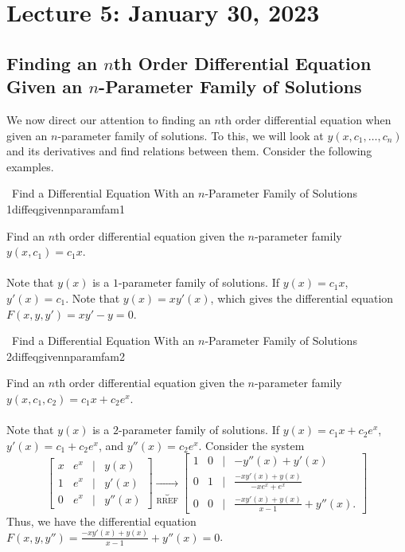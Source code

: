     \pagebreak

\section{Lecture 5: January 30, 2023}

    \subsection{Finding an \(n\)th Order Differential Equation Given an \(n\)-Parameter Family of Solutions}

        We now direct our attention to finding an \(n\)th order differential equation when given an \(n\)-parameter family of solutions. To this, we will look at \(y(x,c_1,\ldots,c_n)\) and its derivatives and find relations between them. Consider the following examples.
        \begin{example}{\Difficulty\,\Difficulty\,\,Find a Differential Equation With an \(n\)-Parameter Family of Solutions 1}{diffeqgivennparamfam1}
            
            Find an \(n\)th order differential equation given the \(n\)-parameter family \(y(x,c_1)=c_1x\).
            \\
            \\
            Note that \(y(x)\) is a \(1\)-parameter family of solutions. If \(y(x)=c_1x\), \(y'(x)=c_1\). Note that \(y(x)=xy'(x)\), which gives the differential equation \(F(x,y,y')=xy'-y=0\).

        \end{example}
        \begin{example}{\Difficulty\,\Difficulty\,\,Find a Differential Equation With an \(n\)-Parameter Family of Solutions 2}{diffeqgivennparamfam2}
            
            Find an \(n\)th order differential equation given the \(n\)-parameter family \(y(x,c_1,c_2)=c_1x+c_2e^x\).
            \\
            \\
            Note that \(y(x)\) is a \(2\)-parameter family of solutions. If \(y(x)=c_1x+c_2e^x\), \(y'(x)=c_1+c_2e^x\), and \(y''(x)=c_2e^x\). Consider the system
            \begin{equation*}
                \begin{bmatrix}
                    x & e^x & | & y(x) \\
                    1 & e^x & | & y'(x) \\
                    0 & e^x & | & y''(x)
                \end{bmatrix}\underbrace{\to}_{\text{RREF}}
                \begin{bmatrix}
                    1 & 0 & | & -y''(x)+y'(x) \\
                    0 & 1 & | & \frac{-xy'(x)+y(x)}{-xe^x+e^x} \\
                    0 & 0 & | & \frac{-xy'(x)+y(x)}{x-1}+y''(x).
                \end{bmatrix}
            \end{equation*}
            Thus, we have the differential equation \(F(x,y,y'')=\frac{-xy'(x)+y(x)}{x-1}+y''(x)=0\).
        \end{example}
